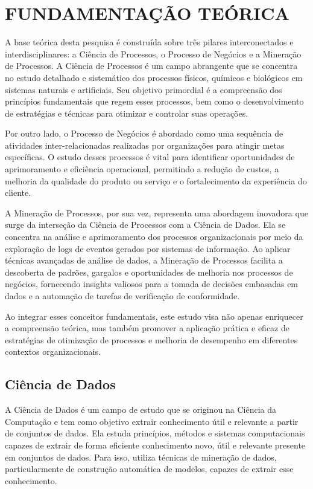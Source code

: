 \documentclass[tcc2]{classe_uftex/uftex}
\begin{document}
\chapter{FUNDAMENTAÇÃO TEÓRICA}

A base teórica desta pesquisa é construída sobre três pilares interconectados e interdisciplinares: a Ciência de Processos, o Processo de Negócios e a Mineração de Processos. A Ciência de Processos é um campo abrangente que se concentra no estudo detalhado e sistemático dos processos físicos, químicos e biológicos em sistemas naturais e artificiais. Seu objetivo primordial é a compreensão dos princípios fundamentais que regem esses processos, bem como o desenvolvimento de estratégias e técnicas para otimizar e controlar suas operações.

Por outro lado, o Processo de Negócios é abordado como uma sequência de atividades inter-relacionadas realizadas por organizações para atingir metas específicas. O estudo desses processos é vital para identificar oportunidades de aprimoramento e eficiência operacional, permitindo a redução de custos, a melhoria da qualidade do produto ou serviço e o fortalecimento da experiência do cliente.

A Mineração de Processos, por sua vez, representa uma abordagem inovadora que surge da interseção da Ciência de Processos com a Ciência de Dados. Ela se concentra na análise e aprimoramento dos processos organizacionais por meio da exploração de logs de eventos gerados por sistemas de informação. Ao aplicar técnicas avançadas de análise de dados, a Mineração de Processos facilita a descoberta de padrões, gargalos e oportunidades de melhoria nos processos de negócios, fornecendo insights valiosos para a tomada de decisões embasadas em dados e a automação de tarefas de verificação de conformidade.

Ao integrar esses conceitos fundamentais, este estudo visa não apenas enriquecer a compreensão teórica, mas também promover a aplicação prática e eficaz de estratégias de otimização de processos e melhoria de desempenho em diferentes contextos organizacionais.

\section{Ciência de Dados}

A Ciência de Dados é um campo de estudo que se originou na Ciência da Computação e tem como objetivo extrair conhecimento útil e relevante a partir de conjuntos de dados. Ela estuda princípios, métodos e sistemas computacionais capazes de extrair de forma eficiente conhecimento novo, útil e relevante presente em conjuntos de dados. Para isso, utiliza técnicas de mineração de dados, particularmente de construção automática de modelos, capazes de extrair esse conhecimento.\cite{gomes2019mineraccao}
\end{document}
